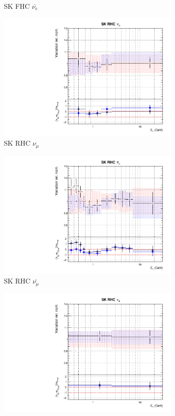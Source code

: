 \begin{figure}[t]
\begin{subfigure}{0.45\textwidth}
  \caption{SK FHC $\bar{\nu_{e}}$}
\end{subfigure}
\begin{subfigure}{0.45\textwidth}
  \centering
  \includegraphics[width=0.75\linewidth]{figs/rhcmpdat28flux_12}
  \caption{SK RHC $\nu_{\mu}$}
\end{subfigure}
\begin{subfigure}{0.45\textwidth}
  \centering
  \includegraphics[width=0.75\linewidth]{figs/rhcmpdat28flux_13}
  \caption{SK RHC $\bar{\nu_{\mu}}$}
\end{subfigure}
\begin{subfigure}{0.45\textwidth}
  \centering
  \includegraphics[width=0.75\linewidth]{figs/rhcmpdat28flux_14}

\end{subfigure}
\end{figure}
